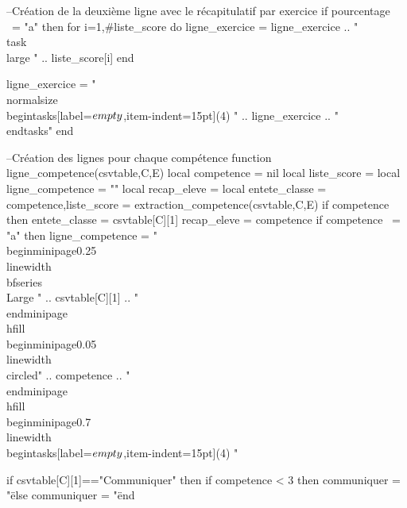 \documentclass{article}
\newcommand*\circled[1]{\tikz[baseline=(char.base)]{
            \node[shape=circle,draw,inner sep=2pt] (char) {#1};}}
\begin{document}
\begin{luacode*}
{        --Création de la deuxième ligne avec le récapitulatif par exercice
        if pourcentage ~= "a" then
            for i=1,#liste_score do
            ligne_exercice = ligne_exercice .. "\\task \\large " .. liste_score[i]
            end
    
            ligne_exercice = "\\normalsize\\begin{tasks}[label=$\\empty$,item-indent=15pt](4) " .. ligne_exercice .. "\\end{tasks}"
        end
    
        --Création des lignes pour chaque compétence
        function ligne_competence(csvtable,C,E)
            local competence = nil
            local liste_score = {}
            local ligne_competence = ""
            local recap_eleve = {}
            local entete_classe = {}
            competence,liste_score = extraction_competence(csvtable,C,E)
            if competence then
                entete_classe = csvtable[C][1]
                recap_eleve = competence
                if competence ~= "a" then
                    ligne_competence = "\\begin{minipage}{0.25\\linewidth}\\bfseries\\Large " .. csvtable[C][1] .. "\\end{minipage}\\hfill\\begin{minipage}{0.05\\linewidth}\\circled{" .. competence .. "}\\end{minipage}\\hfill\\begin{minipage}{0.7\\linewidth}\\begin{tasks}[label=$\\empty$,item-indent=15pt](4) "
    
                        if csvtable[C][1]=="Communiquer" then
                            if competence < 3 then
                                communiquer = "\"
                            else
                                communiquer = "\"
                            end
    
}
\end{luacode*}
\end{document}
